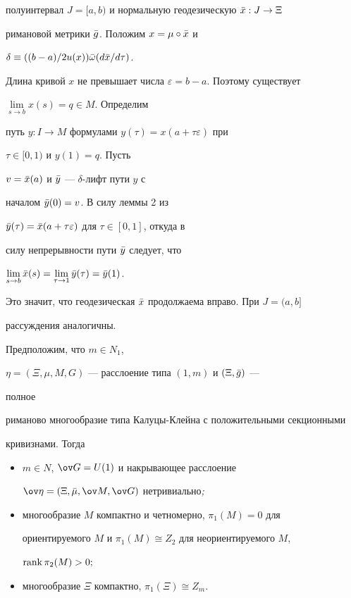\begin{pf}
полуинтервал $J=[a,b)$ и нормальную геодезическую $\Bar x:J\to\Xi$ 


римановой метрики $\Bar g$. Положим $x=\mu\circ\Bar x$ и 


$\delta\equiv((b-a)/2u(x))\Bar\omega(d\Bar x/d\tau)$. 


Длина кривой $x$ не превышает числа $\varepsilon=b-a$. Поэтому существует 


$\lim\limits_{s\to b}x(s)=q\in M$. Определим 


путь $y:I\to M$ формулами $y(\tau)=x(a+\tau\varepsilon)$ при 


$\tau\in[0,1)$ и $y(1)=q$. Пусть 


$v=\Bar x(a)$ и $\Bar y$ --- $\delta$-лифт пути $y$ с 


началом $\Bar y(0)=v$. В силу леммы 2 из \cite{Yak} 


$\Bar y(\tau)=\Bar x(a+\tau\varepsilon)$ для $\tau\in[0,1]$, откуда в 


силу непрерывности пути $\Bar y$ следует, что 


$\lim\limits_{s\to b}\Bar x(s)=\lim\limits_{\tau\to 1}\Bar y(\tau)= 


\Bar y(1)$. 


Это значит, что геодезическая $\Bar x$ продолжаема вправо. При $J=(a,b]$ 


рассуждения аналогичны. 


\end{pf} 


 


\begin{thm} Предположим, что $m\in N_1$, 


$\eta=(\Xi,\mu,M,G)$ --- расслоение типа $(1,m)$ и $(\Xi,\Bar g)$ --- 


полное 


риманово многообразие типа Калуцы-Клейна с положительными секционными 


кривизнами. Тогда 


\begin{itemize} 


\item[1)] $m\in N$, $\ov G=U(1)$ и накрывающее расслоение 


$\ov\eta=(\Xi,\Bar\mu,\ov M,\ov G)$ нетривиально{\em ;} 


\item[2)] многообразие $M$ компактно и четномерно, $\pi_1(M)=0$ для 


ориентируемого $M$ и $\pi_1(M)\cong Z_2$ для неориентируемого $M$, 


$\operatorname{rank}\pi_2(M)>0;$ 


\item[3)] многообразие $\Xi$ компактно, $\pi_1(\Xi)\cong Z_m$. 


\end{itemize} 


\end{thm} 


